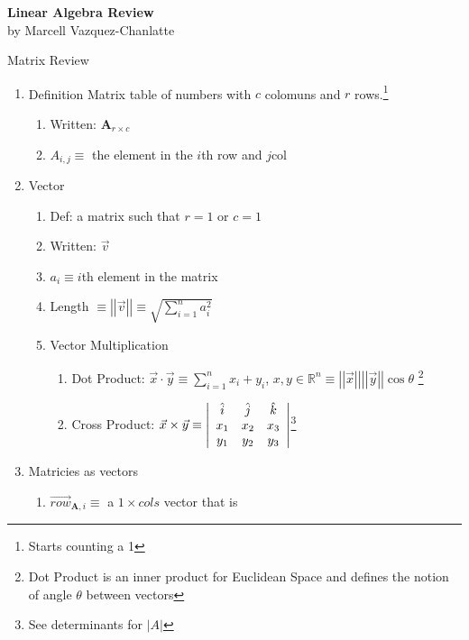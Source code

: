 \documentclass[12pt]{article}
\renewcommand{\=}[1]{\stackrel{#1}{=}} %
\theoremstyle{definition}
\theoremstyle{remark}
\newcommand{\norm}[1]{\left| \left| #1 \right| \right|}
\begin{document}
\begin{center}
  {\LARGE
    \textbf{Linear Algebra Review}\\
    \normalsize
    \textnormal {by Marcell Vazquez-Chanlatte}
    \\[1ex]}

\end{center}

Matrix Review
\begin{enumerate}
\item Definition Matrix table of numbers with $c$ colomuns and $r$
  rows.\footnote{Starts counting a 1}
  \begin{enumerate}
  \item Written: $\mathbf{A}_{r\times c}$
  \item $A_{i,j} \equiv$ the element in the $i$th row and $j$col
  \end{enumerate}
\item Vector
  \begin{enumerate}
  \item Def: a matrix such that $r=1$ or $c=1$
  \item Written: $\vec{v}$
  \item $a_{i} \equiv i$th element in the matrix
  \item Length $\equiv \norm{\vec{v}} \equiv \sqrt{\sum_{i=1}^n a_i^2}$
  \item Vector Multiplication
    \begin{enumerate}
    \item Dot Product: $\vec{x}\cdot \vec{y} \equiv
      \sum_{i=1}^{n}x_i+y_i$, $x,y\in \mathbb{R}^n \equiv \norm{\vec{x}}\norm{\vec{y}}\cos{\theta}$
      \footnote{Dot Product is an inner product for Euclidean Space and
        defines the notion of angle $\theta$ between vectors}
    \item Cross Product: $\vec{x}\times \vec{y} \equiv
      \left| \begin{array}{c c c}
          \hat{i} & \hat{j} & \hat{k} \\
          x_1 & x_2 & x_3 \\
          y_1 & y_2 & y_3 \\
      \end{array} \right|
    $\footnote{See determinants for $|A|$} 
    \end{enumerate}
  \end{enumerate}
\item Matricies as vectors
  \begin{enumerate}
  \item $\vec{row}_{\mathbf{A},i} \equiv$ a $1 \times cols$ vector that is

\end{enumerate}
\end{enumerate}
\end{document}
